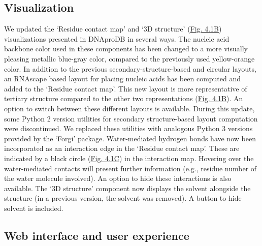 \subsection{Visualization}
We updated the ‘Residue contact map’ and ‘3D structure’ (\hyperref[fig:dnaprodb1]{Fig. 4.1B}) visualizations presented in DNAproDB in several ways. The nucleic acid backbone color used in these components has been changed to a more visually pleasing metallic blue-gray color, compared to the previously used yellow-orange color. 
In addition to the previous secondary-structure-based and circular layouts, an RNAscape \citep{Mitra2024rnascape} based layout for placing nucleic acids has been computed and added to the ‘Residue contact map’. This new layout is more representative of tertiary structure compared to the other two representations (\hyperref[fig:dnaprodb1]{Fig. 4.1B}). An option to switch between these different layouts is available.
During this update, some Python 2 version utilities for secondary structure-based layout computation were discontinued. We replaced these utilities with analogous Python 3 versions provided by the ‘Forgi’ \citep{Thiel2019} package. 
Water-mediated hydrogen bonds have now been incorporated as an interaction edge in the ‘Residue contact map’. These are indicated by a black circle (\hyperref[fig:dnaprodb1]{Fig. 4.1C}) in the interaction map. Hovering over the water-mediated contacts will present further information (e.g., residue number of the water molecule involved). An option to hide these interactions is also available. The ‘3D structure’ component now displays the solvent alongside the structure (in a previous version, the solvent was removed). A button to hide solvent is included. 

\subsection{Web interface and user experience}

